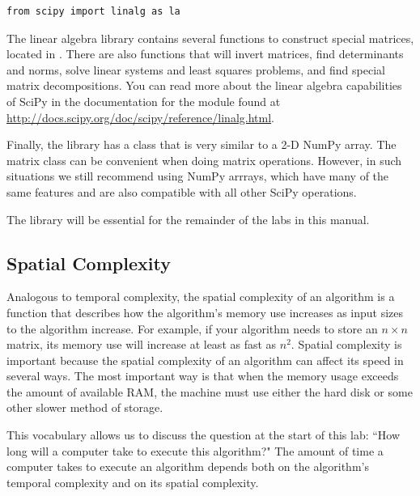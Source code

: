 \begin{lstlisting}
from scipy import linalg as la
\end{lstlisting}

The linear algebra library contains several functions to construct special
matrices, located in .
There are also functions that will invert matrices, find determinants and norms, solve linear systems and least squares problems, and find special matrix decompositions.
You can read more about the linear algebra capabilities of SciPy in the documentation for the  module found at \url{http://docs.scipy.org/doc/scipy/reference/linalg.html}.

Finally, the  library has a  class that is very
similar to a 2-D NumPy array.
The matrix class can be convenient when doing matrix operations.
However, in such situations we still recommend using NumPy arrrays, which have many of the same features and are also compatible with all other SciPy operations.

The  library will be essential for the remainder of the labs in this manual.

\subsection*{Spatial Complexity} %

Analogous to temporal complexity, the spatial complexity of an algorithm is a function that describes how the algorithm's memory use increases as input sizes to the algorithm increase. For example, if your algorithm needs to store an $n \times n$ matrix, its memory use will increase at least as fast as $n^2$. Spatial complexity is important because  the spatial complexity of an algorithm can affect its speed in several ways. The most important way is that when the memory usage exceeds the amount of available RAM, the machine must use either the hard disk or some other slower method of storage.

This vocabulary allows us to discuss the question at the start of this lab: ``How long will a computer take to execute this algorithm?" The amount of time a computer takes to execute an algorithm depends both on the algorithm's temporal complexity and on its spatial complexity.

